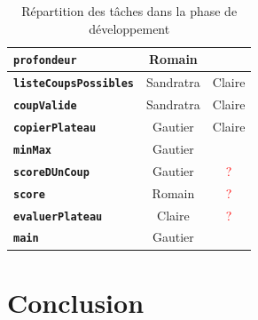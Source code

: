 \documentclass[11pt]{report}
\begin{document}
\begin{table}[h]
\begin{center}
\begin{tabular}{c|c|c|}
  \multicolumn{1}{|l|}{\textbf{\texttt{profondeur}}} & Romain & \cellcolor{lightgray} \\ \hline
  \multicolumn{1}{|l|}{\textbf{\texttt{listeCoupsPossibles}}} & Sandratra & Claire \\ \hline
 \multicolumn{1}{|l|}{ \textbf{\texttt{coupValide}}} & Sandratra & Claire\\ \hline
  \multicolumn{1}{|l|}{\textbf{\texttt{copierPlateau}}} & Gautier & Claire \\ \hline
  \multicolumn{1}{|l|}{\textbf{\texttt{minMax}}} & Gautier & \cellcolor{lightgray} \\ \hline
  \multicolumn{1}{|l|}{\textbf{\texttt{scoreDUnCoup}}} & Gautier & \textcolor{red}{?} \\ \hline
  \multicolumn{1}{|l|}{\textbf{\texttt{score}}} & Romain & \textcolor{red}{?} \\ \hline
 \multicolumn{1}{|l|}{ \textbf{\texttt{evaluerPlateau}}} & Claire & \textcolor{red}{?}\\ \hline
 \multicolumn{1}{|l|}{ \textbf{\texttt{main}}} & Gautier & \cellcolor{lightgray} \\ \hline
\end{tabular}
\end{center}
\caption{Répartition des tâches dans la phase de développement}
\end{table}
\thispagestyle{plain}
\chapter*{Conclusion}
\end{document}
